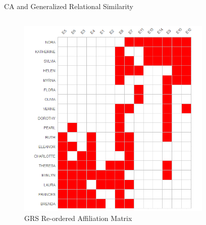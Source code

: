 \documentclass[
  ignorenonframetext,
]{beamer}
\begin{document}
\begin{frame}{CA and Generalized Relational Similarity}
\protect\hypertarget{ca-and-generalized-relational-similarity-4}{}
\begin{columns}[T]
\begin{column}{0.5\textwidth}
\begin{figure}

{\centering \includegraphics{Plots/grs-plot-reord.png}

}

\caption{GRS Re-ordered Affiliation Matrix}

\end{figure}
\end{column}

\begin{column}{0.5\textwidth}
\begin{figure}


\end{figure}
\end{column}
\end{columns}
\end{frame}
\end{document}

